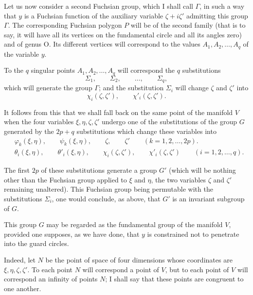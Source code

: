 \documentclass{article}
\begin{document}
Let us now consider a second Fuchsian group, which I shall call $\Gamma$, in such a way that $y$ is a Fuchsian function of the auxiliary variable $\zeta + i\zeta'$ admitting this group $\Gamma$. The corresponding Fuchsian polygon $P$ will be of the second family (that is to say, it will have all its vertices on the fundamental circle and all its angles zero) and of genus O. Its different vertices will correspond to the values $A_{1}, A_{2}, \ldots, A_{q}$ of the variable $y$.

To the $q$ singular points $A_{1}, A_{2}, \ldots, A_{q}$ will correspond the $q$ substitutions
\[ \Sigma_{1}, \qquad \Sigma_{2}, \qquad \ldots, \qquad \Sigma_{q}, \]
which will generate the group $\Gamma$; and the substitution $\Sigma_{i}$ will change $\zeta$ and $\zeta'$ into
\[ \chi_{i}(\zeta, \zeta'), \qquad \chi'_{i}(\zeta, \zeta'). \]

It follows from this that we shall fall back on the same point of the manifold $V$ when the four variables $\xi, \eta, \zeta, \zeta'$ undergo one of the substitutions of the group $G$ generated by the $2p + q$ substitutions
which change these variables into
\[ \begin{aligned} &\varphi_{k}(\xi, \eta), \qquad \psi_{k}(\xi, \eta), \qquad \zeta, \qquad \zeta' \qquad (k = 1, 2, \ldots, 2p).\\ &\theta_{i}(\xi, \eta), \qquad \theta'_{i}(\xi, \eta), \qquad \chi_{i}(\zeta, \zeta'), \qquad \chi'_{i}(\zeta, \zeta') \qquad (i = 1, 2, \ldots, q). \end{aligned} \]

The first $2p$ of these substitutions generate a group $G'$ (which will be nothing other than the Fuchsian group applied to $\xi$ and $\eta$, the two variables $\zeta$ and $\zeta'$ remaining unaltered). This Fuchsian group being permutable with the substitutions $\Sigma_{i}$, one would conclude, as above, that $G'$ is an invariant subgroup of $G$.

This group $G$ may be regarded as the fundamental group of the manifold $V$, provided one supposes, as we have done, that $y$ is constrained not to penetrate into the guard circles.

Indeed, let $N$ be the point of space of four dimensions whose coordinates are $\xi, \eta, \zeta, \zeta'$. To each point $N$ will correspond a point of $V$, but to each point of $V$ will correspond an infinity of points $N$; I shall say that these points are congruent to one another.
\end{document}

